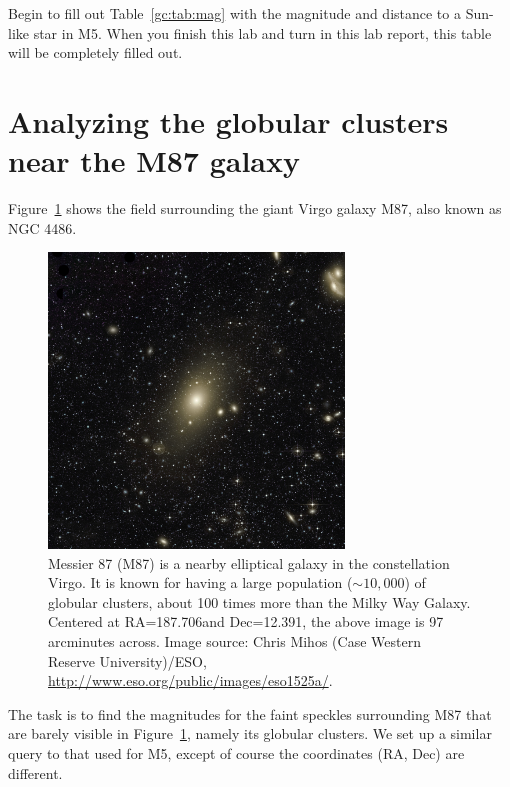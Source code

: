 \begin{steps}
	\item Begin to fill out Table~\ref{gc:tab:mag} with the magnitude and distance to a Sun-like star
	in M5. When you finish this lab and turn in this lab report, this table will
	be completely filled out.
\end{steps}

\section{Analyzing the globular clusters near the M87 galaxy}

Figure~\ref{gc:fig:m87} shows the field surrounding the giant Virgo galaxy M87, also known as NGC 4486.

\begin{figure}
	\centering
	\includegraphics[width=0.7\textwidth]{globular-cluster/eso1525a}
	\caption{Messier 87 (M87) is a nearby elliptical galaxy in the constellation Virgo. It is
		known for having a large population ($\sim 10,000$) of globular clusters, about 100 times more
		than the Milky Way Galaxy. Centered at RA=187.706\textdegree and Dec=12.391\textdegree, the above image
		is 97 arcminutes across. Image source: Chris Mihos (Case Western Reserve University)/ESO, \url{http://www.eso.org/public/images/eso1525a/}.}\label{gc:fig:m87}
\end{figure}

The task is to find the magnitudes for the faint speckles surrounding M87 that are barely visible in
Figure~\ref{gc:fig:m87}, namely its globular clusters. We set up a similar query to that used for M5, except
of course the coordinates (RA, Dec) are different.

